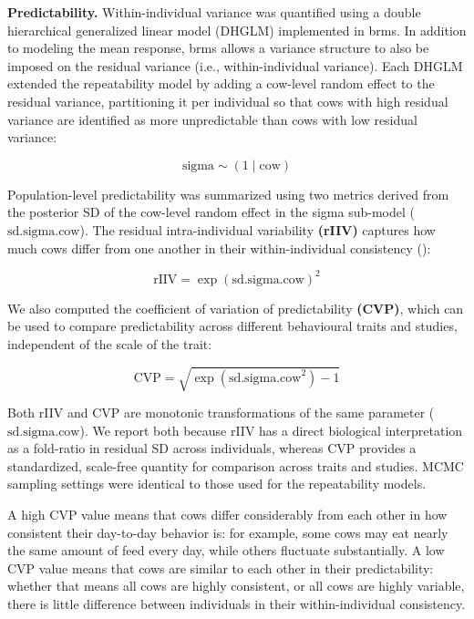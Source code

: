 \documentclass[
]{article}
\begin{document}
\textbf{Predictability.} Within-individual variance was quantified using
a double hierarchical generalized linear model (DHGLM) implemented in
brms. In addition to modeling the mean response, brms allows a variance
structure to also be imposed on the residual variance (i.e.,
within-individual variance). Each DHGLM extended the repeatability model
by adding a cow-level random effect to the residual variance,
partitioning it per individual so that cows with high residual variance
are identified as more unpredictable than cows with low residual
variance:

\[
\text{sigma} \sim (1 \mid \text{cow})
\]

Population-level predictability was summarized using two metrics derived
from the posterior SD of the cow-level random effect in the sigma
sub-model (\(\text{sd.sigma.cow}\)). The residual intra-individual
variability \textbf{(rIIV)} captures how much cows differ from one
another in their within-individual consistency
():

\[
\text{rIIV} = \exp(\text{sd.sigma.cow})^2
\]

We also computed the coefficient of variation of predictability
\textbf{(CVP)}, which can be used to compare predictability across
different behavioural traits and studies, independent of the scale of
the trait:

\[
\text{CVP} = \sqrt{\exp(\text{sd.sigma.cow}^2) - 1}
\]

Both rIIV and CVP are monotonic transformations of the same parameter
(\(\text{sd.sigma.cow}\)). We report both because rIIV has a direct
biological interpretation as a fold-ratio in residual SD across
individuals, whereas CVP provides a standardized, scale-free quantity
for comparison across traits and studies. MCMC sampling settings were
identical to those used for the repeatability models.

A high CVP value means that cows differ considerably from each other in
how consistent their day-to-day behavior is: for example, some cows may
eat nearly the same amount of feed every day, while others fluctuate
substantially. A low CVP value means that cows are similar to each other
in their predictability: whether that means all cows are highly
consistent, or all cows are highly variable, there is little difference
between individuals in their within-individual consistency.
\end{document}
